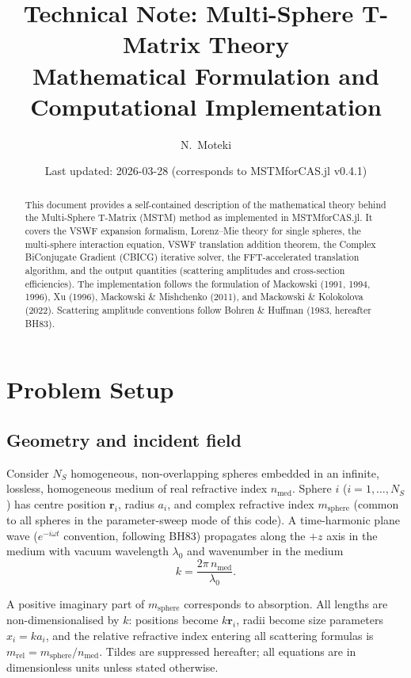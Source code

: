 \documentclass[11pt,a4paper]{article}
\title{Technical Note: Multi-Sphere T-Matrix Theory\\[4pt]
\large Mathematical Formulation and Computational Implementation}
\author{N.\ Moteki}
\date{Last updated: 2026-03-28 (corresponds to MSTMforCAS.jl v0.4.1)}
\begin{document}
\maketitle

\begin{abstract}
This document provides a self-contained description of the mathematical theory behind the Multi-Sphere T-Matrix (MSTM) method as implemented in MSTMforCAS.jl.
It covers the VSWF expansion formalism, Lorenz--Mie theory for single spheres, the multi-sphere interaction equation, VSWF translation addition theorem, the Complex BiConjugate Gradient (CBICG) iterative solver, the FFT-accelerated translation algorithm, and the output quantities (scattering amplitudes and cross-section efficiencies).
The implementation follows the formulation of Mackowski (1991, 1994, 1996), Xu (1996), Mackowski \& Mishchenko (2011), and Mackowski \& Kolokolova (2022).
Scattering amplitude conventions follow Bohren \& Huffman (1983, hereafter BH83).
\end{abstract}

\tableofcontents

\section{Problem Setup}
\label{sec:problem-setup}

\subsection{Geometry and incident field}

Consider $N_S$ homogeneous, non-overlapping spheres embedded in an infinite, lossless, homogeneous medium of real refractive index $n_\mathrm{med}$.
Sphere $i$ ($i = 1, \dots, N_S$) has centre position $\bm{r}_i$, radius $a_i$, and complex refractive index $m_\mathrm{sphere}$ (common to all spheres in the parameter-sweep mode of this code).
A time-harmonic plane wave ($e^{-i\omega t}$ convention, following BH83) propagates along the $+z$ axis in the medium with vacuum wavelength $\lambda_0$ and wavenumber in the medium
\begin{equation}
  k = \frac{2\pi \, n_\mathrm{med}}{\lambda_0}.
  \label{eq:wavenumber}
\end{equation}

A positive imaginary part of $m_\mathrm{sphere}$ corresponds to absorption.
All lengths are non-dimensionalised by $k$: positions become $k\bm{r}_i$, radii become size parameters $x_i = k a_i$, and the relative refractive index entering all scattering formulas is $m_\mathrm{rel} = m_\mathrm{sphere} / n_\mathrm{med}$.
Tildes are suppressed hereafter; all equations are in dimensionless units unless stated otherwise.
\end{document}
